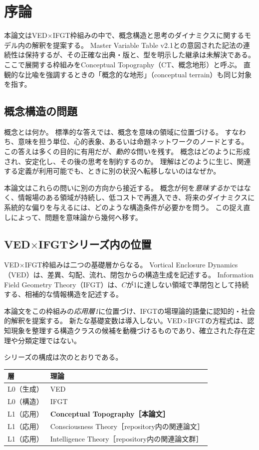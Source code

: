 \section{序論}
\label{sec:introduction}

本論文はVED$\times$IFGT枠組み\citep{VED_vol1, IFGT}の中で、概念構造と思考のダイナミクスに関するモデル内の解釈を提案する。
Master Variable Table v2.1との意図された記法の連続性は保持するが、その正確な出典・版と、型を明示した継承は未解決である。
ここで展開する枠組みをConceptual Topography（CT、概念地形）と呼ぶ。
直観的な比喩を強調するときの「概念的な地形」（conceptual terrain）も同じ対象を指す。

\subsection{概念構造の問題}
概念とは何か。
標準的な答えでは、概念を意味の領域に位置づける。
すなわち、意味を担う単位、心的表象、あるいは命題ネットワークのノードとする。
この答えは多くの目的に有用だが、\emph{動的な}問いを残す。
概念はどのように形成され、安定化し、その後の思考を制約するのか。
理解はどのように生じ、関連する定義が利用可能でも、ときに別の状況へ転移しないのはなぜか。

本論文はこれらの問いに別の方向から接近する。
概念が何を\emph{意味する}かではなく、情報場のある領域が持続し、低コストで再進入でき、将来のダイナミクスに系統的な偏りを与えるには、どのような構造条件が必要かを問う。
この捉え直しによって、問題を意味論から幾何へ移す。

\subsection{\texorpdfstring{VED$\times$IFGT}{VED x IFGT}シリーズ内の位置}
VED$\times$IFGT枠組みは二つの基礎層からなる。
Vortical Enclosure Dynamics（VED）は、差異、勾配、流れ、閉包からの構造生成を記述する\citep{VED_vol1}。
Information Field Geometry Theory（IFGT）は、$C$が1に達しない領域で準閉包として持続する、相補的な情報構造を記述する\citep{IFGT}。

本論文をこの枠組みの\emph{応用層1}に位置づけ、IFGTの場理論的語彙に認知的・社会的解釈を提案する。
新たな基礎変数は導入しない。VED$\times$IFGTの方程式は、認知現象を整理する構造クラスの候補を動機づけるものであり、確立された存在定理や分類定理ではない。

シリーズの構成は次のとおりである。
\begin{center}
\begin{tabular}{ll}
\toprule
層 & 理論 \\
\midrule
L0（生成） & VED \\
L0（構造） & IFGT \\
L1（応用） & \textbf{Conceptual Topography［本論文］} \\
L1（応用） & Consciousness Theory［repository内の関連論文］ \\
L1（応用） & Intelligence Theory［repository内の関連論文群］ \\
\bottomrule
\end{tabular}
\end{center}

